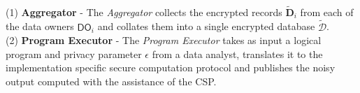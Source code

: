 \\
(1)\textbf{  Aggregator} - The \textit{Aggregator} collects the encrypted records $\mathbf{\tilde{D}}_i$ from each of the data owners $\textsf{DO}_i$ and collates them into a single encrypted database $\boldsymbol{\tilde{\mathcal{D}}}$. %
\\(2)\textbf{ Program Executor }- The \textit{Program Executor} takes as input a logical \system program and privacy parameter $\epsilon$ from a data analyst, translates it to the implementation specific secure computation protocol and publishes the noisy output computed with the assistance of the \textsf{CSP}. %
